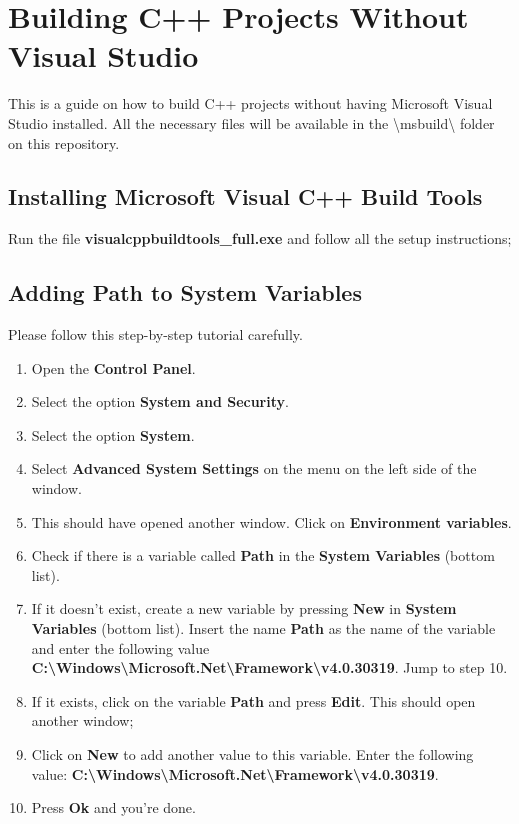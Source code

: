 \chapter{Building C++ Projects Without Visual Studio}

This is a guide on how to build C++ projects without having Microsoft Visual Studio installed.
All the necessary files will be available in the \textbackslash{}msbuild\textbackslash{} folder on this repository.


\section{Installing Microsoft Visual C++ Build Tools}
  Run the file \textbf{visualcppbuildtools\_full.exe} and follow all the setup instructions;
\section{Adding Path to System Variables}
  Please follow this step-by-step tutorial carefully.
  \begin{enumerate}
    \item Open the \textbf{Control Panel}.
    \item Select the option \textbf{System and Security}.
    \item Select the option \textbf{System}.
    \item Select \textbf{Advanced System Settings} on the menu on the left side of the window.
    \item This should have opened another window. Click on \textbf{Environment variables}.
    \item Check if there is a variable called \textbf{Path} in the \textbf{System Variables} (bottom list).
    \item If it doesn't exist, create a new variable by pressing \textbf{New} in \textbf{System Variables} (bottom list). Insert the name \textbf{Path} as the name of the variable and enter the following value \textbf{C:\textbackslash{}Windows\textbackslash{}Microsoft.Net\textbackslash{}Framework\textbackslash{}v4.0.30319}. Jump to step 10.
    \item If it exists, click on the variable \textbf{Path} and press \textbf{Edit}. This should open another window;
    \item Click on \textbf{New} to add another value to this variable. Enter the following value: \textbf{C:\textbackslash{}Windows\textbackslash{}Microsoft.Net\textbackslash{}Framework\textbackslash{}v4.0.30319}.
    \item Press \textbf{Ok} and you're done.
    \pagebreak
  \end{enumerate}
